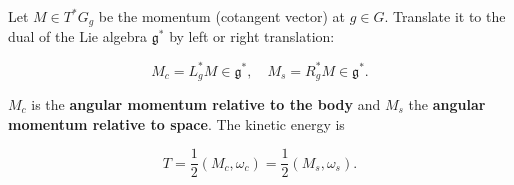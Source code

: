 Let $M \in T^*G_g$ be the momentum (cotangent vector) at $g \in G$. Translate it to the dual of the Lie algebra $\mathfrak{g}^*$ by left or right translation:

$$M_c = L_g^* M \in \mathfrak{g}^*, \quad M_s = R_g^* M \in \mathfrak{g}^*.$$

$M_c$ is the \textbf{angular momentum relative to the body} and $M_s$ the \textbf{angular momentum relative to space}. The kinetic energy is

$$T = \frac{1}{2}(M_c, \omega_c) = \frac{1}{2}(M_s, \omega_s).$$
